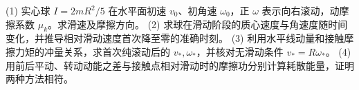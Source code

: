 (1) 实心球 \(I=2mR^2/5\) 在水平面初速 \(v_0\)、初角速 \(\omega_0\)，正 \(\omega\) 表示向右滚动，动摩擦系数 \(\mu_k\)。求滑速及摩擦方向。
(2) 求球在滑动阶段的质心速度与角速度随时间变化，并推导相对滑动速度首次降至零的准确时刻。
(3) 利用水平线动量和接触摩擦力矩的冲量关系，求首次纯滚动后的 \(v_*,\omega_*\)，并核对无滑动条件 \(v_*=R\omega_*\)。
(4) 用前后平动、转动动能之差与接触点相对滑动时的摩擦功分别计算耗散能量，证明两种方法相符。
